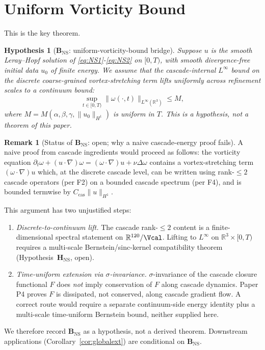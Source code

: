 \documentclass[11pt, a4paper]{amsart}
\newtheorem{hypothesis}[theorem]{Hypothesis}
\theoremstyle{definition}
\newtheorem{remark}[theorem]{Remark}
\newcommand{\R}{\mathbb{R}}
\begin{document}
\section{Uniform Vorticity Bound}\label{sec:vorticity}

This is the key theorem.

\begin{hypothesis}[$\mathbf{B_{\mathrm{NS}}}$: uniform-vorticity-bound bridge]\label{thm:vorticity}
Suppose $u$ is the smooth Leray--Hopf solution of
\eqref{eq:NS1}-\eqref{eq:NS2} on $[0, T)$, with smooth
divergence-free initial data $u_0$ of finite energy.  We assume
that the cascade-internal $L^\infty$ bound on the discrete
coarse-grained vortex-stretching term lifts uniformly across
refinement scales to a continuum bound:
\[
\sup_{t \in [0, T)} \|\omega(\cdot, t)\|_{L^\infty(\R^3)} \leq M,
\]
where $M = M(\alpha, \beta, \gamma, \|u_0\|_{H^1})$ is uniform in $T$.
This is a hypothesis, not a theorem of this paper.
\end{hypothesis}

\begin{remark}[Status of $\mathbf{B_{\mathrm{NS}}}$: open; why a naive cascade-energy proof fails]\label{rmk:vorticity_status}
A naive proof from cascade ingredients would proceed as follows:
the vorticity equation
$\partial_t\omega + (u\cdot\nabla)\omega
= (\omega\cdot\nabla)u + \nu\Delta\omega$
contains a vortex-stretching term $(\omega\cdot\nabla)u$ which, at
the discrete cascade level, can be written using rank-$\le 2$
cascade operators (per F2) on a bounded cascade spectrum (per F4),
and is bounded termwise by $C_{\mathrm{cas}}\|u\|_{H^1}$.

This argument has two unjustified steps:
\begin{enumerate}
\item \emph{Discrete-to-continuum lift.} The cascade rank-$\le 2$
content is a finite-dimensional spectral statement on
$\R^{120}/\Vcal$.  Lifting to $L^\infty$ on
$\R^3\times[0,T)$ requires a multi-scale Bernstein/sinc-kernel
compatibility theorem (Hypothesis~$\mathbf{H_{\mathrm{NS}}}$, open).
\item \emph{Time-uniform extension via $\sigma$-invariance.}
$\sigma$-invariance of the cascade closure functional $F$ does
\emph{not} imply conservation of $F$ along cascade dynamics.
Paper P4 proves $F$ is dissipated, not conserved, along cascade
gradient flow.  A correct route would require a separate
continuum-side energy identity plus a multi-scale time-uniform
Bernstein bound, neither supplied here.
\end{enumerate}
We therefore record $\mathbf{B_{\mathrm{NS}}}$ as a hypothesis,
not a derived theorem.  Downstream applications
(Corollary~\ref{cor:globalext}) are conditional on
$\mathbf{B_{\mathrm{NS}}}$.
\end{remark}
\end{document}

